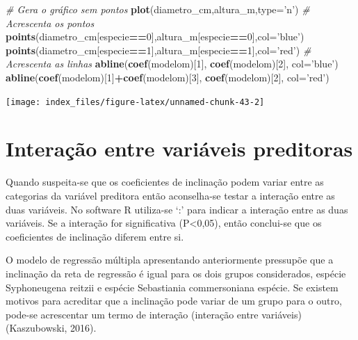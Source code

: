 \documentclass[12pt,brazil,oneside]{book}
\newenvironment{Shaded}{\begin{snugshade}}{\end{snugshade}}
\newcommand{\CommentTok}[1]{\textcolor[rgb]{0.56,0.35,0.01}{\textit{#1}}}
\newcommand{\DataTypeTok}[1]{\textcolor[rgb]{0.13,0.29,0.53}{#1}}
\newcommand{\DecValTok}[1]{\textcolor[rgb]{0.00,0.00,0.81}{#1}}
\newcommand{\KeywordTok}[1]{\textcolor[rgb]{0.13,0.29,0.53}{\textbf{#1}}}
\newcommand{\NormalTok}[1]{#1}
\newcommand{\OperatorTok}[1]{\textcolor[rgb]{0.81,0.36,0.00}{\textbf{#1}}}
\newcommand{\StringTok}[1]{\textcolor[rgb]{0.31,0.60,0.02}{#1}}
\begin{document}
\begin{Shaded}
\begin{Highlighting}[]
\CommentTok{# Gera o gráfico sem pontos}
\KeywordTok{plot}\NormalTok{(diametro_cm,altura_m,}\DataTypeTok{type=}\StringTok{'n'}\NormalTok{) }
\CommentTok{# Acrescenta os pontos}
\KeywordTok{points}\NormalTok{(diametro_cm[especie}\OperatorTok{==}\DecValTok{0}\NormalTok{],altura_m[especie}\OperatorTok{==}\DecValTok{0}\NormalTok{],}\DataTypeTok{col=}\StringTok{'blue'}\NormalTok{)}
\KeywordTok{points}\NormalTok{(diametro_cm[especie}\OperatorTok{==}\DecValTok{1}\NormalTok{],altura_m[especie}\OperatorTok{==}\DecValTok{1}\NormalTok{],}\DataTypeTok{col=}\StringTok{'red'}\NormalTok{)}
\CommentTok{# Acrescenta as linhas}
\KeywordTok{abline}\NormalTok{(}\KeywordTok{coef}\NormalTok{(modelom)[}\DecValTok{1}\NormalTok{], }\KeywordTok{coef}\NormalTok{(modelom)[}\DecValTok{2}\NormalTok{], }\DataTypeTok{col=}\StringTok{'blue'}\NormalTok{)}
\KeywordTok{abline}\NormalTok{(}\KeywordTok{coef}\NormalTok{(modelom)[}\DecValTok{1}\NormalTok{]}\OperatorTok{+}\KeywordTok{coef}\NormalTok{(modelom)[}\DecValTok{3}\NormalTok{], }\KeywordTok{coef}\NormalTok{(modelom)[}\DecValTok{2}\NormalTok{], }\DataTypeTok{col=}\StringTok{'red'}\NormalTok{)}
\end{Highlighting}
\end{Shaded}

\begin{center}\texttt{[image: index\_files/figure-latex/unnamed-chunk-43-2]} \end{center}

\hypertarget{interacao-entre-variaveis-preditoras}{%
\section{Interação entre variáveis preditoras}\label{interacao-entre-variaveis-preditoras}}

Quando suspeita-se que os coeficientes de inclinação podem variar entre as categorias da variável preditora então aconselha-se testar a interação entre as duas variáveis. No software R utiliza-se `:' para indicar a interação entre as duas variáveis. Se a interação for significativa (P\textless{}0,05), então conclui-se que os coeficientes de inclinação diferem entre si.

O modelo de regressão múltipla apresentando anteriormente pressupõe que a inclinação da reta de regressão é igual para os dois grupos considerados, espécie Syphoneugena reitzii e espécie Sebastiania commersoniana espécie. Se existem motivos para acreditar que a inclinação pode variar de um grupo para o outro, pode-se acrescentar um termo de interação (interação entre variáveis) (Kaszubowski, 2016).
\end{document}
